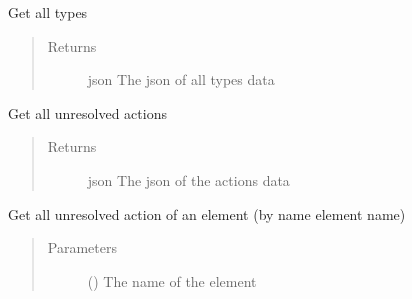 \documentclass[letterpaper,10pt,english]{sphinxmanual}
\begin{document}
\begin{fulllineitems}
\begin{fulllineitems}
\begin{quote}
\begin{description}
\end{description}\end{quote}

\end{fulllineitems}


\begin{fulllineitems}
\label{\detokenize{index:Api.Api.get_types}}
\sphinxAtStartPar
Get all types
\begin{quote}\begin{description}
\item[{Returns}] \leavevmode
\sphinxAtStartPar
json \textendash{} The json of all types data

\end{description}\end{quote}

\end{fulllineitems}


\begin{fulllineitems}
\label{\detokenize{index:Api.Api.get_unresolved_actions}}
\sphinxAtStartPar
Get all unresolved actions
\begin{quote}\begin{description}
\item[{Returns}] \leavevmode
\sphinxAtStartPar
json \textendash{} The json of the actions data

\end{description}\end{quote}

\end{fulllineitems}


\begin{fulllineitems}
\label{\detokenize{index:Api.Api.get_unresolved_actions_by_element_name}}
\sphinxAtStartPar
Get all unresolved action of an element (by name element name)
\begin{quote}\begin{description}
\item[{Parameters}] \leavevmode
\sphinxAtStartPar
{} () \textendash{} The name of the element


\end{description}
\end{quote}
\end{fulllineitems}
\end{fulllineitems}
\end{document}
